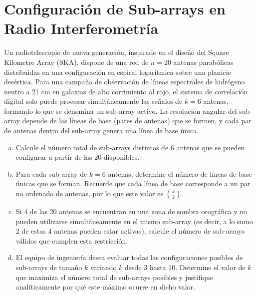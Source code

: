 \documentclass[a4paper]{article}
\begin{document}
\section{Configuración de Sub-arrays en Radio Interferometría}
\label{sec:problema-30}

Un radiotelescopio de nueva generación, inspirado en el diseño del Square Kilometre Array (SKA), dispone de una red de $n = 20$ antenas parabólicas distribuidas en una configuración en espiral logarítmica sobre una planicie desértica. Para una campaña de observación de líneas espectrales de hidrógeno neutro a 21 cm en galaxias de alto corrimiento al rojo, el sistema de correlación digital solo puede procesar simultáneamente las señales de $k = 6$ antenas, formando lo que se denomina un sub-array activo. La resolución angular del sub-array depende de las líneas de base (pares de antenas) que se formen, y cada par de antenas dentro del sub-array genera una línea de base única.



\begin{enumerate}[a)]
\item Calcule el número total de sub-arrays distintos de 6 antenas que se pueden configurar a partir de las 20 disponibles.
\item Para cada sub-array de $k = 6$ antenas, determine el número de líneas de base únicas que se forman. Recuerde que cada línea de base corresponde a un par no ordenado de antenas, por lo que este valor es $\binom{k}{2}$.
\item Si 4 de las 20 antenas se encuentran en una zona de sombra orográfica y no pueden utilizarse simultáneamente en el mismo sub-array (es decir, a lo sumo 2 de estas 4 antenas pueden estar activas), calcule el número de sub-arrays válidos que cumplen esta restricción.
\item El equipo de ingeniería desea evaluar todas las configuraciones posibles de sub-arrays de tamaño $k$ variando $k$ desde 3 hasta 10. Determine el valor de $k$ que maximiza el número total de sub-arrays posibles y justifique analíticamente por qué este máximo ocurre en dicho valor.
\end{enumerate}
\end{document}
